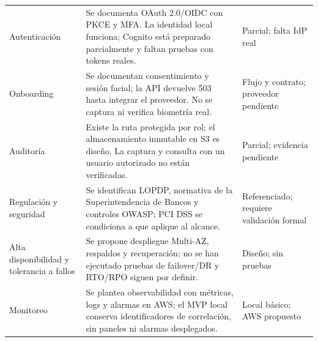 \documentclass[11pt,a4paper]{report}
\begin{document}
\begin{landscape}
\begin{longtable}{@{}>{\raggedright\arraybackslash}p{}>{\raggedright\arraybackslash}p{}>{\raggedright\arraybackslash}p{}@{}}
Autenticaci\'on & Se documenta OAuth 2.0/OIDC con PKCE y MFA. La identidad local funciona; Cognito est\'a preparado parcialmente y faltan pruebas con tokens reales. & Parcial; falta IdP real \\
Onboarding & Se documentan consentimiento y sesi\'on facial; la API devuelve 503 hasta integrar el proveedor. No se captura ni verifica biometr\'ia real. & Flujo y contrato; proveedor pendiente \\
Auditor\'ia & Existe la ruta protegida por rol; el almacenamiento inmutable en S3 es dise\~no. La captura y consulta con un usuario autorizado no est\'an verificadas. & Parcial; evidencia pendiente \\
Regulaci\'on y seguridad & Se identifican LOPDP, normativa de la Superintendencia de Bancos y controles OWASP; PCI DSS se condiciona a que aplique al alcance. & Referenciado; requiere validaci\'on formal \\
Alta disponibilidad y tolerancia a fallos & Se propone despliegue Multi-AZ, respaldos y recuperaci\'on; no se han ejecutado pruebas de failover/DR y RTO/RPO siguen por definir. & Dise\~no; sin pruebas \\
Monitoreo & Se plantea observabilidad con m\'etricas, logs y alarmas en AWS; el MVP local conserva identificadores de correlaci\'on, sin paneles ni alarmas desplegados. & Local b\'asico; AWS propuesto \\
\bottomrule
\end{longtable}
\endgroup
\end{landscape}
\end{document}
